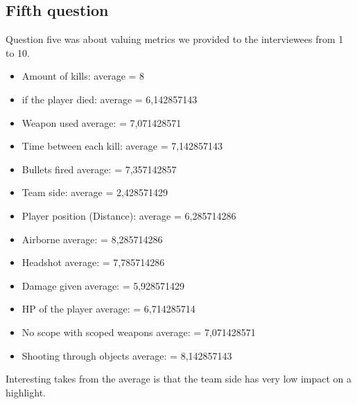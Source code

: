 \subsection{Fifth question}
Question five was about valuing metrics we provided to the interviewees from 1 to 10.
        \begin{itemize}
        \item Amount of kills: average = 8
        \item if the player died: average = 6,142857143
        \item Weapon used average: = 7,071428571
        \item Time between each kill: average = 7,142857143
        \item Bullets fired average: = 7,357142857
        \item Team side: average = 2,428571429
        \item Player position (Distance): average = 6,285714286
        \item Airborne average: = 8,285714286
        \item Headshot average: = 7,785714286
        \item Damage given average: = 5,928571429
        \item HP of the player average: = 6,714285714
        \item No scope with scoped weapons average: = 7,071428571
        \item Shooting through objects average: = 8,142857143
    \end{itemize}
Interesting takes from the average is that the team side has very low impact on a highlight.\\\\
